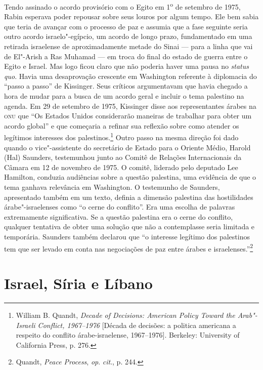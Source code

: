 Tendo assinado o acordo provisório com o Egito em 1\textsuperscript{o}
de setembro de 1975, Rabin esperava poder repousar sobre seus louros por
algum tempo. Ele bem sabia que teria de avançar com o processo de paz
e assumia que a fase seguinte seria outro acordo israelo"-egípcio, um
acordo de longo prazo, fundamentado em uma retirada israelense de
aproximadamente metade do Sinai --- para a linha que vai de El"-Arish a
Ras Muhamad --- em troca do final do estado de guerra entre o Egito e
Israel. Mas logo ficou claro que não poderia haver uma pausa no
\emph{status quo}. Havia uma desaprovação crescente em Washington referente à
diplomacia do ``passo a passo'' de Kissinger. Seus críticos argumentavam
que havia chegado a hora de mudar para a busca de um acordo geral e
incluir o tema palestino na agenda. Em 29 de setembro de 1975, Kissinger
disse aos representantes árabes na \textsc{onu} que ``Os Estados Unidos
considerarão maneiras de trabalhar para obter um acordo global'' e que
começaria a refinar sua reflexão sobre como atender os legítimos
interesses dos palestinos.\footnote{William B. Quandt, \emph{Decade of Decisions: American Policy Toward the
Arab"-Israeli Conflict, 1967--1976} {[}Década de decisões: a politica americana a respeito do conflito árabe-israelense, 1967--1976{]}. Berkeley: University of California
Press, p. 276.} Outro passo na mesma direção foi
dado quando o vice"-assistente do secretário de Estado para o Oriente
Médio, Harold (Hal) Saunders, testemunhou junto ao Comitê de Relações
Internacionais da Câmara em 12 de novembro de 1975. O comitê, liderado
pelo deputado Lee Hamilton, conduzia audiências sobre a questão
palestina, uma evidência de que o tema ganhava relevância em Washington.
O testemunho de Saunders, apresentado também em um texto, definia a
dimensão palestina das hostilidades árabe"-israelenses como ``o cerne do
conflito''. Era uma escolha de palavras extremamente significativa. Se a
questão palestina era o cerne do conflito, qualquer tentativa de obter
uma solução que não a contemplasse seria limitada e temporária. Saunders
também declarou que ``o interesse legítimo dos palestinos tem que ser
levado em conta nas negociações de paz entre árabes e
israelenses.''\footnote{Quandt, \emph{Peace Process}, \emph{op}. \emph{cit}., p. 244.}

\section{Israel, Síria e Líbano}

